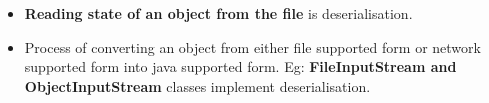 \setlength{\columnsep}{3pt}
\begin{flushleft}
	\begin{itemize}
		\item \textbf{Reading state of an object from the file} is deserialisation.
		\item Process of converting an object from either file supported form or network supported form into java supported form.
		Eg: \textbf{FileInputStream and ObjectInputStream} classes implement deserialisation.
		

	\end{itemize}
\end{flushleft}
